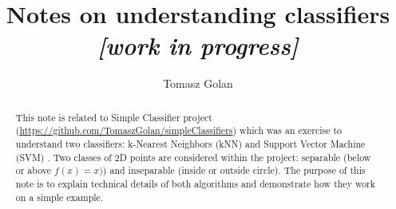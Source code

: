 \documentclass[a4paper,10pt]{article}
\title{Notes on understanding classifiers \\ {\it\large\color{gray} [work in progress]}}
\author{Tomasz Golan}
\begin{document}
\maketitle

\begin{abstract}
This note is related to Simple Classifier project (\url{https://github.com/TomaszGolan/simpleClassifiers}) which was an exercise to understand two classifiers: k-Nearest Neighbors (kNN) and Support Vector Machine (SVM) . Two classes of 2D points are considered within the project: separable (below or above $f(x) = x)$) and inseparable (inside or outside circle). The purpose of this note is to explain technical details of both algorithms and demonstrate how they work on a simple example.
\end{abstract}
\end{document}
